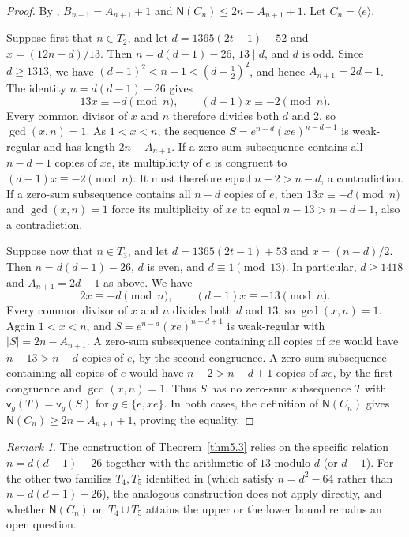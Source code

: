 \documentclass[10pt,reqno]{amsart}
\theoremstyle{definition}
\theoremstyle{remark}
\newtheorem{rem}[thm]{Remark}
\numberwithin{equation}{section}
\begin{document}
\begin{proof}
By \cite[Lemmas~5.2 and~4.3]{[JY2024]},
$B_{n+1}=A_{n+1}+1$ and $\mathsf N(C_n)\le2n-A_{n+1}+1$.
Let $C_n=\langle e\rangle$.

Suppose first that $n\in T_2$, and let
$d=1365(2t-1)-52$ and $x=(12n-d)/13$.
Then $n=d(d-1)-26$, $13\mid d$, and $d$ is odd.
Since $d\ge1313$, we have
$(d-1)^2<n+1<(d-\tfrac12)^2$, and hence $A_{n+1}=2d-1$.
The identity $n=d(d-1)-26$ gives
\[
13x\equiv-d\pmod n,\qquad (d-1)x\equiv-2\pmod n.
\]
Every common divisor of $x$ and $n$ therefore divides both $d$ and $2$,
so $\gcd(x,n)=1$.
As $1<x<n$, the sequence $S=e^{n-d}(xe)^{n-d+1}$ is weak-regular
and has length $2n-A_{n+1}$.
If a zero-sum subsequence contains all $n-d+1$ copies of $xe$,
its multiplicity of $e$ is congruent to $(d-1)x\equiv-2\pmod n$.
It must therefore equal $n-2>n-d$, a contradiction.
If a zero-sum subsequence contains all $n-d$ copies of $e$,
then $13x\equiv-d\pmod n$ and $\gcd(x,n)=1$ force its
multiplicity of $xe$ to equal $n-13>n-d+1$, also a contradiction.

Suppose now that $n\in T_3$, and let
$d=1365(2t-1)+53$ and $x=(n-d)/2$.
Then $n=d(d-1)-26$, $d$ is even, and $d\equiv1\pmod{13}$.
In particular, $d\ge1418$ and $A_{n+1}=2d-1$ as above. We have
\[
2x\equiv-d\pmod n,\qquad (d-1)x\equiv-13\pmod n.
\]
Every common divisor of $x$ and $n$ divides both $d$ and $13$,
so $\gcd(x,n)=1$.
Again $1<x<n$, and $S=e^{n-d}(xe)^{n-d+1}$ is weak-regular
with $|S|=2n-A_{n+1}$.
A zero-sum subsequence containing all copies of $xe$ would have
$n-13>n-d$ copies of $e$, by the second congruence.
A zero-sum subsequence containing all copies of $e$ would have
$n-2>n-d+1$ copies of $xe$, by the first congruence and $\gcd(x,n)=1$.
Thus $S$ has no zero-sum subsequence $T$ with
$\mathsf v_g(T)=\mathsf v_g(S)$ for $g\in\{e,xe\}$.
In both cases, the definition of $\mathsf N(C_n)$ gives
$\mathsf N(C_n)\ge2n-A_{n+1}+1$, proving the equality.
\end{proof}

\begin{rem}
	The construction of Theorem~\ref{thm5.3} relies on the specific relation
	$n=d(d-1)-26$ together with the arithmetic of $13$ modulo $d$ (or $d-1$).
	For the other two families $T_4,T_5$ identified in \cite[Lemma~5.2]{[JY2024]}
	(which satisfy $n=d^2-64$ rather than $n=d(d-1)-26$), the analogous construction
	does not apply directly, and whether $\mathsf{N}(C_n)$ on $T_4\cup T_5$ attains
	the upper or the lower bound remains an open question.
\end{rem}
\end{document}
